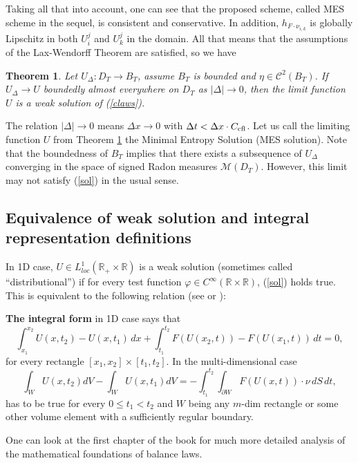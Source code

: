 \documentclass[11pt,a4paper,reqno]{amsart}
\theoremstyle{plain}
\newtheorem{theorem}{Theorem}[section]
\theoremstyle{definition}
\theoremstyle{remark}
\numberwithin{equation}{section}
\begin{document}
{Taking all that into account, one can see that the proposed scheme,
called MES scheme in the sequel, is consistent 
and conservative. In addition, $h_{F\cdot \nu_{i,k}}$ is globally Lipschitz in 
both $U_{i}^{j}$ and $U_{k}^{j}$ in the domain. 
All that means that the assumptions of the Lax-Wendorff Theorem are satisfied, 
so we have 
\begin{theorem} \label{lw}
Let $U_{\Delta}:D_{T} \to B_{T}$, assume $B_{T}$ is bounded and 
$\eta\in \mathcal{C}^{2}(B_{T})$.
If $U_{\Delta} \to U$ boundedly almost everywhere on $D_{T}$ as $|\Delta|\to 0$, then the limit function $U$ is a weak solution of (\ref{claws}).
\end{theorem}

The relation $|\Delta|\to 0$ means $\Delta x \to 0$ with 
$\Delta t < \Delta x \cdot C_{\rm{cfl}}$.
Let us call the limiting function $U$ from Theorem \ref{lw} the 
Minimal Entropy Solution (MES solution).
Note that the boundedness of $B_{T}$ implies that there exists a subsequence 
of $U_{\Delta}$ converging in the space of signed Radon measures $\mathcal{M}(D_{T})$.  However, this limit may not satisfy (\ref{sol}) in the usual sense.


\subsection{Equivalence of weak solution and integral representation definitions}
	
In 1D case, $U\in L^{1}_{loc}(\mathbb{R}_{+}\times \mathbb{R})$ is a weak solution 
(sometimes called ``distributional'') if for every test function 
$\varphi \in C^{\infty}(\mathbb{R}\times \mathbb{R})$, (\ref{sol}) holds true.
This is equivalent to the following relation (see \cite{CM} or \cite{CD2005}):

\noindent
{\bf The integral form} in 1D case says that 
\begin{equation} \label{if}
\int ^{x_{2}}_{x_{1}}U( x,t_{2}) -U( x,t_{1}) \, dx+\int ^{t_{2}}_{t_{1}}
F( U( x_{2},t) ) -F( U( x_{1},t) ) \, dt=0,
\end{equation}
for every rectangle $[x_{1},x_{2}] \times [t_{1},t_{2}]$.
In the multi-dimensional case
\[
\int _{W}U(x,t_{2}) dV-\int _{W}U(x,t_{1}) dV=-\int_{t_{1}}^{t_{2}}\int _{\partial W}{F}( U( x,t) ) \cdot \nu \, dS\, dt,
\]
has to be true for every $0\leq t_{1} < t_{2}$ and $W$ being any 
$m$-dim rectangle or some other volume element with 
a sufficiently regular boundary.

One can look at the first chapter of the book \cite{CD2005} for much more 
detailed analysis of the mathematical foundations of balance laws.

}
\end{document}
